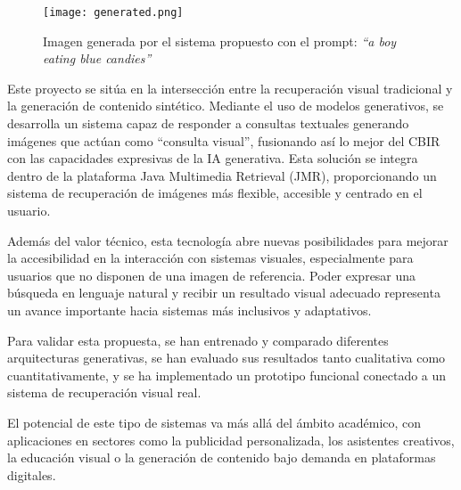 \begin{figure}[ht]
    \centering
    \texttt{[image: generated.png]}
    \caption{Imagen generada por el sistema propuesto con el prompt: \textit{``a boy eating blue candies''}}
    \label{fig:generado}
\end{figure}

Este proyecto se sitúa en la intersección entre la recuperación visual tradicional y la generación de contenido sintético. Mediante el uso de modelos generativos, se desarrolla un sistema capaz de responder a consultas textuales generando imágenes que actúan como ``consulta visual'', fusionando así lo mejor del CBIR con las capacidades expresivas de la IA generativa. Esta solución se integra dentro de la plataforma Java Multimedia Retrieval (JMR), proporcionando un sistema de recuperación de imágenes más flexible, accesible y centrado en el usuario.

Además del valor técnico, esta tecnología abre nuevas posibilidades para mejorar la accesibilidad en la interacción con sistemas visuales, especialmente para usuarios que no disponen de una imagen de referencia. Poder expresar una búsqueda en lenguaje natural y recibir un resultado visual adecuado representa un avance importante hacia sistemas más inclusivos y adaptativos.

Para validar esta propuesta, se han entrenado y comparado diferentes arquitecturas generativas, se han evaluado sus resultados tanto cualitativa como cuantitativamente, y se ha implementado un prototipo funcional conectado a un sistema de recuperación visual real.

El potencial de este tipo de sistemas va más allá del ámbito académico, con aplicaciones en sectores como la publicidad personalizada, los asistentes creativos, la educación visual o la generación de contenido bajo demanda en plataformas digitales.
